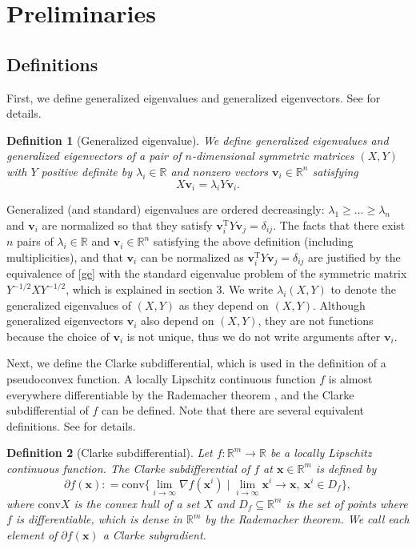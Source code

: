 \documentclass[sn-mathphys,Numbered]{sn-jnl}%
\theoremstyle{thmstyleone}%
\theoremstyle{thmstyletwo}%
\theoremstyle{thmstylethree}%
\newtheorem{definition}{Definition}%
\newcommand{\e}[1]{\begin{equation}#1\end{equation}}
\def\coloneq{\mathrel{\mathop:}=}
\def\rn{\mathbb{R}^n}
\def\rm{\mathbb{R}^m}
\def\tp{\mathrm{T}}
\def\cpartial{\partial}
\begin{document}
\section{Preliminaries}

\subsection{Definitions}
\label{s_def}

First, we define generalized eigenvalues and generalized eigenvectors. See \cite{harville97,boyd93} for details.

\begin{definition}[Generalized eigenvalue]
We define generalized eigenvalues and generalized eigenvectors of a pair of $n$-dimensional symmetric matrices $(X,Y)$ with $Y$ positive definite by $\lambda_i\in\mathbb{R}$ and nonzero vectors $\bm{v}_i\in\rn$ satisfying
\e{
X\bm{v}_i=\lambda_i Y\bm{v}_i.
\label{ge}
}
\end{definition}

Generalized (and standard) eigenvalues are ordered decreasingly: $\lambda_1\ge\ldots\ge\lambda_n$ and $\bm{v}_i$ are normalized so that they satisfy $\bm{v}_i^\tp Y\bm{v}_j=\delta_{ij}$. The facts that there exist $n$ pairs of $\lambda_i\in\mathbb{R}$ and $\bm{v}_i\in\rn$ satisfying the above definition (including multiplicities), and that $\bm{v}_i$ can be normalized as $\bm{v}_i^\tp Y\bm{v}_j=\delta_{ij}$ are justified by the equivalence of \eqref{ge} with the standard eigenvalue problem of the symmetric matrix $Y^{-1/2}XY^{-1/2}$, which is explained in section 3. We write $\lambda_i(X,Y)$ to denote the generalized eigenvalues of $(X,Y)$ as they depend on $(X,Y)$. Although generalized eigenvectors $\bm{v}_i$ also depend on $(X,Y)$, they are not functions because the choice of $\bm{v}_i$ is not unique, thus we do not write arguments after $\bm{v}_i$.

Next, we define the Clarke subdifferential, which is used in the definition of a pseudoconvex function. A locally Lipschitz continuous function $f$ is almost everywhere differentiable by the Rademacher theorem \cite{rockafellar98}, and the Clarke subdifferential of $f$ can be defined. Note that there are several equivalent definitions. See \cite{clarke90} for details.

\begin{definition}[Clarke subdifferential]
Let $f:\rm\to\mathbb{R}$ be a locally Lipschitz continuous function. The Clarke subdifferential of $f$ at $\bm{x}\in\rm$ is defined by
\e{
\cpartial f(\bm{x})\coloneq\mathrm{conv}\{\underset{i\to\infty}{\lim}\nabla f(\bm{x}^i) \mid \underset{i\to\infty}{\lim} \bm{x}^i\to\bm{x},\ \bm{x}^i\in D_f \},
}
where $\mathrm{conv}X$ is the convex hull of a set $X$ and $D_f\subseteq\rm$ is the set of points where $f$ is differentiable, which is dense in $\rm$ by the Rademacher theorem. We call each element of $\cpartial f(\bm{x})$ a Clarke subgradient.
\end{definition}
\end{document}
